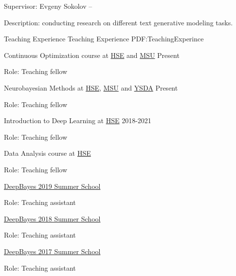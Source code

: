\documentclass[letterpaper,MMMyyyy,nonstopmode]{simpleresumecv}
\begin{document}
\begin{Body}
\Gap
\BulletItem
Supervisor: Evgeny Sokolov
\hfill
{} --
\begin{Detail}
\SubBulletItem
Description: conducting research on different text generative modeling tasks.
\end{Detail}



\Section
{Teaching Experience}
{Teaching Experience}
{PDF:TeachingExperince}

\BulletItem
Continuous Optimization course at \href{https://cs.hse.ru/en/}{HSE} and \href{https://cs.msu.ru/en}{MSU}
\hfill
Present
\begin{Detail}
\Item
Role: Teaching fellow
\end{Detail}

\BulletItem
Neurobayesian Methods at \href{https://cs.hse.ru/en/}{HSE}, \href{https://cs.msu.ru/en}{MSU} and \href{https://yandexdataschool.com}{YSDA}
\hfill
Present
\begin{Detail}
\Item
Role: Teaching fellow
\end{Detail}

\BulletItem
Introduction to Deep Learning at \href{https://cs.hse.ru/en/}{HSE}
\hfill
2018-2021
\begin{Detail}
\Item
Role: Teaching fellow
\end{Detail}

\BulletItem
Data Analysis course at \href{https://cs.hse.ru/en/}{HSE}
\hfill
{}
\begin{Detail}
\Item
Role: Teaching fellow
\end{Detail}

\BulletItem
\href{http://deepbayes.ru}{DeepBayes 2019 Summer School}
\hfill
{}
\begin{Detail}
\Item
Role: Teaching assistant
\end{Detail}

\BulletItem
\href{http://deepbayes.ru/2018/}{DeepBayes 2018 Summer School}
\hfill
{}
\begin{Detail}
\Item
Role: Teaching assistant
\end{Detail}

\BulletItem
\href{http://deepbayes.ru/2017/}{DeepBayes 2017 Summer School}
\hfill
{}
\begin{Detail}
\Item
Role: Teaching assistant
\end{Detail}


\end{Body}
\end{document}
